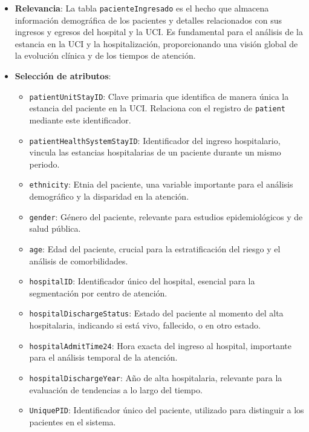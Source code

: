 \documentclass[12pt, a4paper, twoside]{article}
\begin{document}
	
	
	\begin{itemize}
		\item \textbf{Relevancia}: La tabla \texttt{pacienteIngresado} es el hecho que almacena información demográfica de los pacientes y detalles relacionados con sus ingresos y egresos del hospital y la UCI. Es fundamental para el análisis de la estancia en la UCI y la hospitalización, proporcionando una visión global de la evolución clínica y de los tiempos de atención.
		
		\item \textbf{Selección de atributos}:
		\begin{itemize}
			\item \texttt{patientUnitStayID}: Clave primaria que identifica de manera única la estancia del paciente en la UCI. Relaciona con el registro de \texttt{patient} mediante este identificador.
			\item \texttt{patientHealthSystemStayID}: Identificador del ingreso hospitalario, vincula las estancias hospitalarias de un paciente durante un mismo periodo.
			\item \texttt{ethnicity}: Etnia del paciente, una variable importante para el análisis demográfico y la disparidad en la atención.
			\item \texttt{gender}: Género del paciente, relevante para estudios epidemiológicos y de salud pública.
			\item \texttt{age}: Edad del paciente, crucial para la estratificación del riesgo y el análisis de comorbilidades.
			\item \texttt{hospitalID}: Identificador único del hospital, esencial para la segmentación por centro de atención.
			\item \texttt{hospitalDischargeStatus}: Estado del paciente al momento del alta hospitalaria, indicando si está vivo, fallecido, o en otro estado.
			\item \texttt{hospitalAdmitTime24}: Hora exacta del ingreso al hospital, importante para el análisis temporal de la atención.
			\item \texttt{hospitalDischargeYear}: Año de alta hospitalaria, relevante para la evaluación de tendencias a lo largo del tiempo.
			\item \texttt{UniquePID}: Identificador único del paciente, utilizado para distinguir a los pacientes en el sistema.
		\end{itemize}
		
	\end{itemize}
	
\end{document}
